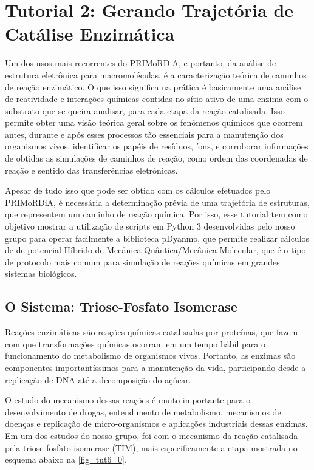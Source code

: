 \documentclass[a4paper,11pt]{refart}
\begin{document}
	\newpage
	\section{Tutorial 2: Gerando Trajetória de Catálise Enzimática}
	
	Um dos usos mais recorrentes do PRIMoRDiA, e portanto, da análise de estrutura eletrônica para macromoléculas, é a caracterização teórica de caminhos de reação enzimático. O que isso significa na prática é basicamente uma análise de reatividade e interações químicas contidas no sítio ativo de uma enzima com o substrato que se queira analisar, para cada etapa da reação catalisada. Isso permite obter uma visão teórica geral sobre os fenômenos químicos que ocorrem antes, durante e após esses processos tão essenciais para a manutenção dos organismos vivos, identificar os papéis de resíduos, íons, e corroborar informações de obtidas as simulações de caminhos de reação, como ordem das coordenadas de reação e  sentido das transferências eletrônicas.
	 
	Apesar de tudo isso que pode ser obtido com os cálculos efetuados pelo PRIMoRDiA, é necessária a determinação prévia de uma trajetória de estruturas, que representem um caminho de reação química. Por isso, esse tutorial tem como objetivo mostrar a utilização de scripts em Python 3 desenvolvidas pelo nosso grupo para operar facilmente a biblioteca pDyanmo, que permite realizar cálculos de de potencial Híbrido de Mecânica Quântica/Mecânica Molecular, que é o tipo de protocolo mais comum para simulação de reações químicas em grandes sistemas biológicos. 
	
	\subsection{O Sistema: Triose-Fosfato Isomerase} 
	
	Reações enzimáticas são reações químicas catalisadas por proteínas, que fazem com que transformações químicas ocorram em um tempo hábil para o funcionamento do metabolismo de organismos vivos. Portanto, as enzimas são componentes importantíssimos para a manutenção da vida, participando desde a replicação de DNA até a decomposição do açúcar.
	
	O estudo do mecanismo dessas reações é muito importante para o desenvolvimento de drogas, entendimento de metabolismo, mecanismos de doenças e replicação de micro-organismos e aplicações industriais dessas enzimas. Em um dos estudos do nosso grupo, foi com o mecanismo da reação catalisada pela triose-fosfato-isomerase (TIM)\cite{grillo_elucidating_2020}, mais especificamente a etapa mostrada no esquema abaixo na \autoref{fig_tut6_0}.
	
\end{document}
